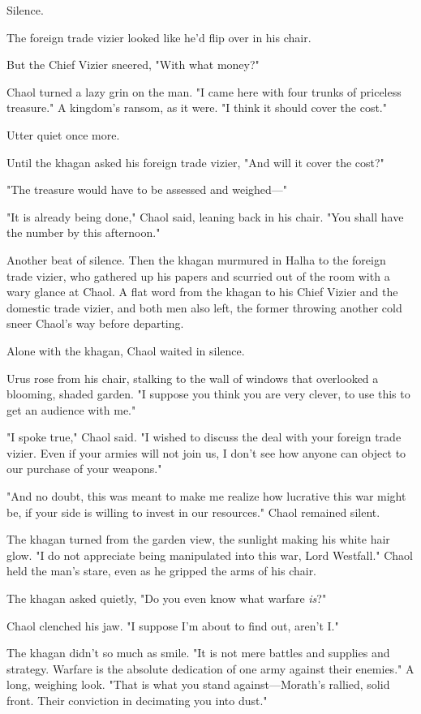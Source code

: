 Silence.

The foreign trade vizier looked like he'd flip over in his chair.

But the Chief Vizier sneered, "With what money?"

Chaol turned a lazy grin on the man.
"I came here with four trunks of priceless treasure."
A kingdom's ransom, as it were.
"I think it should cover the cost."

Utter quiet once more.

Until the khagan asked his foreign trade vizier, "And will it cover the cost?"

"The treasure would have to be assessed and weighed---"

"It is already being done," Chaol said, leaning back in his chair.
"You shall have the number by this afternoon."

Another beat of silence.
Then the khagan murmured in Halha to the foreign trade vizier, who gathered up his papers and scurried out of the room with a wary glance at Chaol.
A flat word from the khagan to his Chief Vizier and the domestic trade vizier, and both men also left, the former throwing another cold sneer Chaol's way before departing.

Alone with the khagan, Chaol waited in silence.

Urus rose from his chair, stalking to the wall of windows that overlooked a blooming, shaded garden.
"I suppose you think you are very clever, to use this to get an audience with me."

"I spoke true," Chaol said.
"I wished to discuss the deal with your foreign trade vizier.
Even if your armies will not join us, I don't see how anyone can object to our purchase of your weapons."

"And no doubt, this was meant to make me realize how lucrative this war might be, if your side is willing to invest in our resources."
Chaol remained silent.

The khagan turned from the garden view, the sunlight making his white hair glow.
"I do not appreciate being manipulated into this war, Lord Westfall."
Chaol held the man's stare, even as he gripped the arms of his chair.

The khagan asked quietly, "Do you even know what warfare \emph{is}?"

Chaol clenched his jaw.
"I suppose I'm about to find out, aren't I."

The khagan didn't so much as smile.
"It is not mere battles and supplies and strategy.
Warfare is the absolute dedication of one army against their enemies."
A long, weighing look.
"That is what you stand against---Morath's rallied, solid front.
Their conviction in decimating you into dust."

